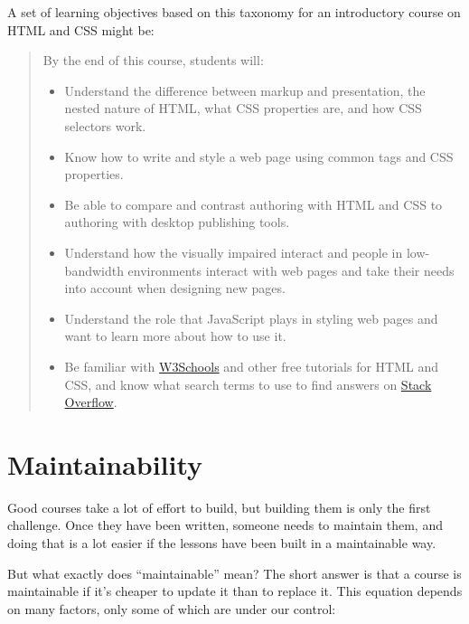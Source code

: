 \documentclass[10pt,statementpaper]{memoir}
\begin{document}
A set of learning objectives based on this taxonomy for an introductory
course on HTML and CSS might be:

\begin{quote}
By the end of this course, students will:

\begin{itemize}
\item
  Understand the difference between markup and presentation, the nested
  nature of HTML, what CSS properties are, and how CSS selectors work.
\item
  Know how to write and style a web page using common tags and CSS
  properties.
\item
  Be able to compare and contrast authoring with HTML and CSS to
  authoring with desktop publishing tools.
\item
  Understand how the visually impaired interact and people in
  low-bandwidth environments interact with web pages and take their
  needs into account when designing new pages.
\item
  Understand the role that JavaScript plays in styling web pages and
  want to learn more about how to use it.
\item
  Be familiar with \href{https://www.w3schools.com/}{W3Schools} and
  other free tutorials for HTML and CSS, and know what search terms to
  use to find answers on \href{https://stackoverflow.com/}{Stack
  Overflow}.
\end{itemize}
\end{quote}

\section{Maintainability}\label{maintainability}

Good courses take a lot of effort to build, but building them is only
the first challenge. Once they have been written, someone needs to
maintain them, and doing that is a lot easier if the lessons have been
built in a maintainable way.

But what exactly does ``maintainable'' mean? The short answer is that a
course is maintainable if it's cheaper to update it than to replace it.
This equation depends on many factors, only some of which are under our
control:
\end{document}

